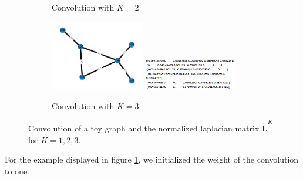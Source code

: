 \documentclass[sigconf]{acmart}
\begin{document}
\begin{figure}
\begin{subfigure}{0.45\textwidth}
        \caption{Convolution with $K=2$}
    \end{subfigure}
    \hfill
    \begin{subfigure}{0.45\textwidth}
        \centering
        \includegraphics[width=0.45\textwidth]{figures/toy_graph_conv_K2.png}
        \includegraphics[width=0.45\textwidth]{figures/lap2.png}
        \caption{Convolution with $K=3$}
    \end{subfigure}
    \hfill
    \caption{Convolution of a toy graph and the normalized laplacian matrix $\widetilde{\mathbf{L}}^K$ for $K=1, 2, 3$.}
    \label{fig:toyGraph}
 \end{figure}
For the example displayed in figure \ref{fig:toyGraph}, we initialized the weight of the convolution to one.



\end{document}
